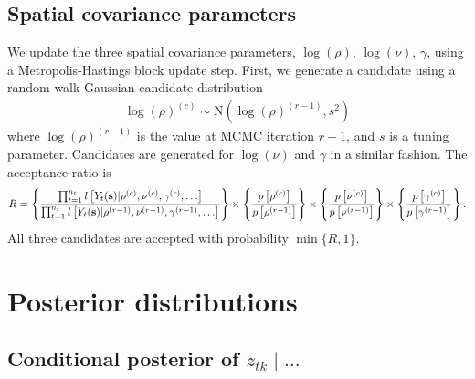\subsection*{Spatial covariance parameters}

We update the three spatial covariance parameters, $\log(\rho)$, $\log(\nu)$, $\gamma$, using a Metropolis-Hastings block update step.
First, we generate a candidate using a random walk Gaussian candidate distribution
\begin{align*}
  \log(\rho)^{(c)} \sim \text{N}\left(\log(\rho)^{(r - 1)}, s^2\right)
\end{align*}
where $\log(\rho)^{(r-1)}$ is the value at MCMC iteration $r - 1$, and $s$ is a tuning parameter.
Candidates are generated for $\log(\nu)$ and $\gamma$ in a similar fashion.
The acceptance ratio is
\begin{align*}
  R = \left\{ \frac{ \prod_{t = 1}^{n_t} l \left[Y_t(\mathbf{s}) | \rho^{(c)}, \nu^{(c)}, \gamma^{(c)}, \ldots \right] }{\prod_{t = 1}^{n_t} l \left[Y_t(\mathbf{s}) | \rho^{(r-1)}, \nu^{(r-1)}, \gamma^{(r-1)}, \ldots \right] } \right\} \times \left\{ \frac{ p \left[\rho^{(c)} \right] }{ p \left[\rho^{(r - 1)}\right] } \right\} \times \left\{ \frac{ p \left[\nu^{(c)} \right] }{ p \left[\nu^{(r - 1)} \right] } \right\} \times \left\{ \frac{ p \left[ \gamma^{(c)} \right] }{ p \left[\gamma^{(r - 1)} \right] } \right\}.
\end{align*}
All three candidates are accepted with probability $\min\{R, 1\}$.

\section{Posterior distributions} \label{sta:posterior}

\subsection*{Conditional posterior of $z_{tk} \mid \ldots $} \label{sts:mvcondu}

